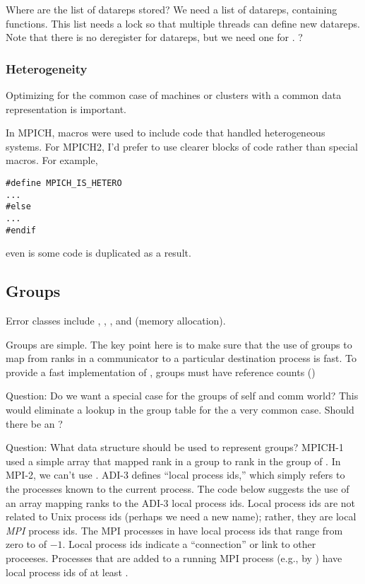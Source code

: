 \documentclass{article}
\begin{document}
Where are the list of datareps stored?  We need a list of datareps,
containing functions.  This list needs a lock so that multiple threads
can define new datareps.  Note that there is no deregister for
datareps, but we need one for .
? 

\subsubsection{Heterogeneity}
\label{sec:hetero}
Optimizing for the common case of machines or clusters with a common
data representation is important.  

In MPICH, macros were used to include code that handled heterogeneous
systems.  For MPICH2, I'd prefer to use clearer blocks of code rather
than special macros.  For example,
\begin{verbatim}
#define MPICH_IS_HETERO
...
#else
...
#endif
\end{verbatim}
even is some code is duplicated as a result.

\subsection{Groups}
\label{sec:groups}

Error classes include , , 
, and  (memory allocation). 

Groups are simple.  The key point here is to make sure that the use of
groups to map from ranks in a communicator to a particular destination
process is fast.
To provide a fast implementation of , groups must
have reference counts ()

Question: Do we want a special case for the groups of self and comm
world?  This would eliminate a lookup in the group table for the a very
common case.  Should there be an ?  

Question: What data structure should be used to represent groups?
MPICH-1 used a simple array that mapped rank in a group to rank in the
group of .  In MPI-2, we can't use
.  ADI-3 defines ``local process ids,'' which
simply refers to the processes known to the current process.  The code below
suggests the use of an array mapping ranks to the ADI-3 local process
ids.  Local 
process ids are not related to Unix process ids (perhaps we need a new name);
rather, they are local \emph{MPI} process ids.  The MPI processes in
 have local process ids that range from zero to
 of  $-1$.  Local process ids
indicate a ``connection'' or link to other proceeses.
Processes that are added to a
running MPI process (e.g., by ) have local process ids
of at least .
\end{document}
